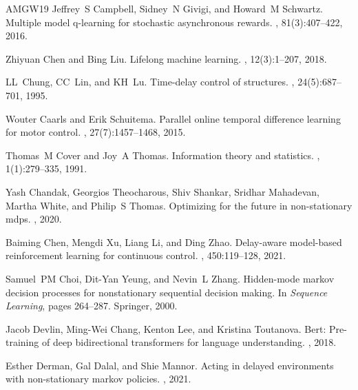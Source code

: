 \begin{thebibliography}{AMGW{\etalchar{+}}19}
Jeffrey~S Campbell, Sidney~N Givigi, and Howard~M Schwartz.
\newblock Multiple model q-learning for stochastic asynchronous rewards.
, 81(3):407--422, 2016.

Zhiyuan Chen and Bing Liu.
\newblock Lifelong machine learning.
, 12(3):1--207, 2018.

LL~Chung, CC~Lin, and KH~Lu.
\newblock Time-delay control of structures.
, 24(5):687--701, 1995.

Wouter Caarls and Erik Schuitema.
\newblock Parallel online temporal difference learning for motor control.
, 27(7):1457--1468, 2015.

Thomas~M Cover and Joy~A Thomas.
\newblock Information theory and statistics.
, 1(1):279--335, 1991.

Yash Chandak, Georgios Theocharous, Shiv Shankar, Sridhar Mahadevan, Martha White, and Philip~S Thomas.
\newblock Optimizing for the future in non-stationary mdps.
, 2020.

Baiming Chen, Mengdi Xu, Liang Li, and Ding Zhao.
\newblock Delay-aware model-based reinforcement learning for continuous control.
, 450:119--128, 2021.

Samuel~PM Choi, Dit-Yan Yeung, and Nevin~L Zhang.
\newblock Hidden-mode markov decision processes for nonstationary sequential decision making.
\newblock In {\em Sequence Learning}, pages 264--287. Springer, 2000.

Jacob Devlin, Ming-Wei Chang, Kenton Lee, and Kristina Toutanova.
\newblock Bert: Pre-training of deep bidirectional transformers for language understanding.
, 2018.

Esther Derman, Gal Dalal, and Shie Mannor.
\newblock Acting in delayed environments with non-stationary markov policies.
, 2021.


\end{thebibliography}
